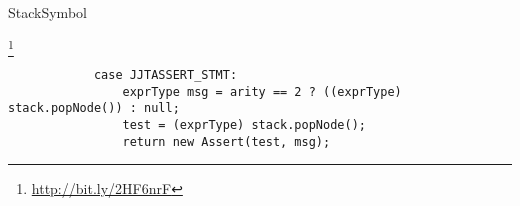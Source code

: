 \begin{pattern}{StackSymbol}

\instances{}

\footnote{\url{http://bit.ly/2HF6nrF}}

\begin{verbatim}
            case JJTASSERT_STMT:
                exprType msg = arity == 2 ? ((exprType) stack.popNode()) : null;
                test = (exprType) stack.popNode();
                return new Assert(test, msg);
\end{verbatim}

\detection{}

\discussion{}

\related{}

\end{pattern}